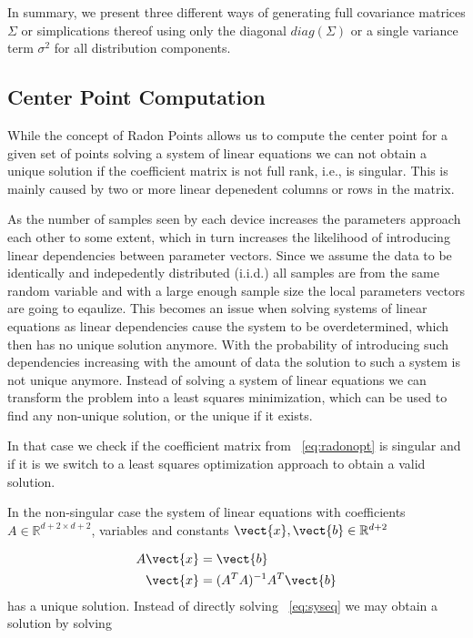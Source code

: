 In summary, we present three different ways of generating full covariance matrices $\Sigma$ or simplications thereof using only the diagonal $diag(\Sigma)$ or a single variance term $\sigma^2$ for all distribution components.

\subsection{Center Point Computation}
While the concept of Radon Points allows us to compute the center point for a given set of points solving a system of linear equations we can not obtain a unique solution if the coefficient matrix is not full rank, i.e., is singular.
This is mainly caused by two or more linear depenedent columns or rows in the matrix.

As the number of samples seen by each device increases the parameters approach each other to some extent, which in turn increases the likelihood of introducing linear dependencies between parameter vectors.
Since we assume the data to be identically and indepedently distributed (i.i.d.) all samples are from the same random variable and with a large enough sample size the local parameters vectors are going to eqaulize.
This becomes an issue when solving systems of linear equations as linear dependencies cause the system to be overdetermined, which then has no unique solution anymore.
With the probability of introducing such dependencies increasing with the amount of data the solution to such a system is not unique anymore.
Instead of solving a system of linear equations we can transform the problem into a least squares minimization, which can be used to find any non-unique solution, or the unique if it exists.

In that case we check if the coefficient matrix from \eq~\ref{eq:radonopt} is singular and if it is we switch to a least squares optimization approach to obtain a valid solution. 

In the non-singular case the system of linear equations with coefficients $A \in \mathbb{R}^{d+2 \times d+2}$, variables and constants $\vect{x}, \vect{b} \in \mathbb{R}^{d+2}$

\begin{equation}
    \label{eq:syseq}
    \begin{split}
        A\vect{x} &= \vect{b} \\
        \vect{x} &= (A^TA)^{-1}A^T \vect{b}
    \end{split}
\end{equation}
has a unique solution.
Instead of directly solving \eq~\ref{eq:syseq} we may obtain a solution by solving

